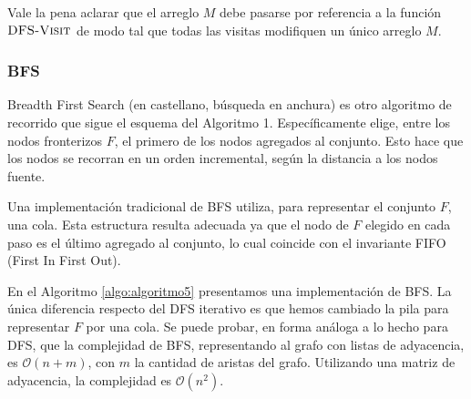Vale la pena aclarar que el arreglo $M$ debe pasarse por referencia a la función $\textsc{DFS-Visit}$ de modo tal que todas las visitas modifiquen un único arreglo $M$.

\subsubsection{BFS}
Breadth First Search (en castellano, búsqueda en anchura) es otro algoritmo de recorrido que sigue el esquema del Algoritmo 1. Específicamente elige, entre los nodos fronterizos $F$, el primero de los nodos agregados al conjunto. Esto hace que los nodos se recorran en un orden incremental, según la distancia a los nodos fuente.

Una implementación tradicional de BFS utiliza, para representar el conjunto $F$, una cola. Esta estructura resulta adecuada ya que el nodo de $F$ elegido en cada paso es el último agregado al conjunto, lo cual coincide con el invariante FIFO (First In First Out).

En el Algoritmo \ref{algo:algoritmo5} presentamos una implementación de BFS. La única diferencia respecto del DFS iterativo es que hemos cambiado la pila para representar $F$ por una cola. Se puede probar, en forma análoga a lo hecho para DFS, que la complejidad de BFS, representando al grafo con listas de adyacencia, es $\mathcal{O}(n + m)$, con $m$ la cantidad de aristas del grafo. Utilizando una matriz de adyacencia, la complejidad es $\mathcal{O}(n^2)$.

\begin{algorithm}
	\DontPrintSemicolon
 	\BlankLine
\caption{$\textsc{BFS}$}
\label{algo:algoritmo5}
\end{algorithm}
